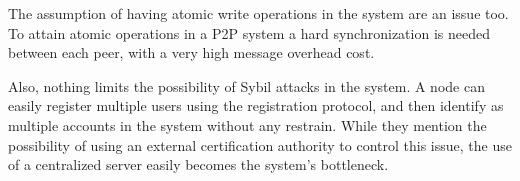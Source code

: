 The assumption of having atomic write operations in the system are an issue too.
To attain atomic operations in a P2P system a hard synchronization is
needed between each peer, with a very high message overhead cost.

Also, nothing limits the possibility of Sybil attacks in the system. A node can
easily register multiple users using the registration protocol, and then identify as multiple
accounts in the system without any restrain. While they mention the possibility
of using an external certification authority to control this issue, the use of a
centralized server easily becomes the system's bottleneck.


